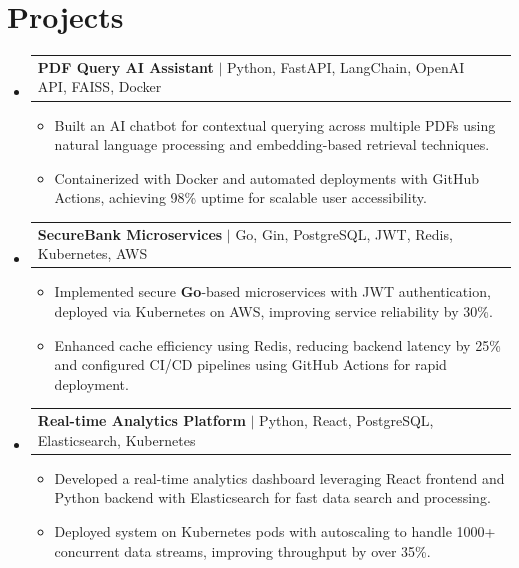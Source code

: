 \documentclass[letterpaper,11pt]{article}
\makeatletter
\newcommand{\resumeItem}[1]{
  \item\footnotesize{
    {#1 \vspace{-2pt}}
  }
}
\newcommand{\resumeProjectHeading}[2]{
    \item
    \begin{tabular*}{1.001\textwidth}{l@{\extracolsep{\fill}}r}
      \small#1 & \textbf{\small #2}\\
    \end{tabular*}\vspace{-7pt}
}
\newcommand{\resumeSubHeadingListStart}{\begin{itemize}[leftmargin=0pt, label={}]}
\newcommand{\resumeSubHeadingListEnd}{\end{itemize}}
\newcommand{\resumeItemListStart}{\begin{itemize}[leftmargin=*]}
\newcommand{\resumeItemListEnd}{\end{itemize}\vspace{-5pt}}
\makeatother
\begin{document}
\section{Projects}
    \vspace{-5pt}
    \resumeSubHeadingListStart

      \resumeProjectHeading
          {\textbf{PDF Query AI Assistant} $|$ Python, FastAPI, LangChain, OpenAI API, FAISS, Docker}{}
        \resumeItemListStart
            \resumeItem{Built an AI chatbot for contextual querying across multiple PDFs using natural language processing and embedding-based retrieval techniques.}
            \resumeItem{Containerized with Docker and automated deployments with GitHub Actions, achieving 98\% uptime for scalable user accessibility.}
        \resumeItemListEnd
        \vspace{-12pt}

      \resumeProjectHeading
          {\textbf{SecureBank Microservices} $|$ Go, Gin, PostgreSQL, JWT, Redis, Kubernetes, AWS}{}
        \resumeItemListStart
            \resumeItem{Implemented secure \textbf{Go}-based microservices with JWT authentication, deployed via Kubernetes on AWS, improving service reliability by 30\%.}
            \resumeItem{Enhanced cache efficiency using Redis, reducing backend latency by 25\% and configured CI/CD pipelines using GitHub Actions for rapid deployment.}
        \resumeItemListEnd
        \vspace{-12pt}

      \resumeProjectHeading
          {\textbf{Real-time Analytics Platform} $|$ Python, React, PostgreSQL, Elasticsearch, Kubernetes}{}
        \resumeItemListStart
            \resumeItem{Developed a real-time analytics dashboard leveraging React frontend and Python backend with Elasticsearch for fast data search and processing.}
            \resumeItem{Deployed system on Kubernetes pods with autoscaling to handle 1000+ concurrent data streams, improving throughput by over 35\%.}
        \resumeItemListEnd

    \resumeSubHeadingListEnd
\end{document}
